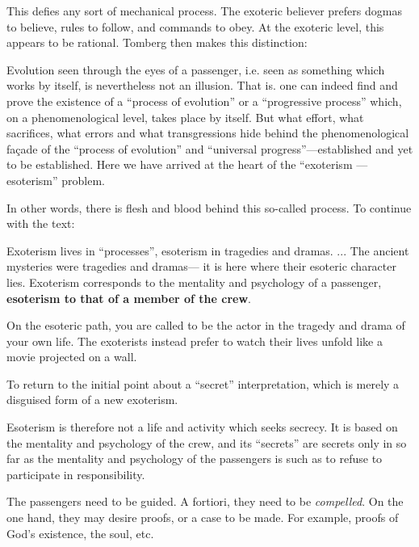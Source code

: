 This defies any sort of mechanical process. The exoteric believer prefers dogmas to believe, rules to follow, and commands to obey. At the exoteric level, this appears to be rational. Tomberg then makes this distinction:

\begin{quotex}
Evolution seen through the eyes of a passenger, i.e. seen as something which works by itself, is nevertheless not an illusion. That is. one can indeed find and prove the existence of a ``process of evolution'' or a ``progressive process'' which, on a phenomenological level, takes place by itself. But what effort, what sacrifices, what errors and what transgressions hide behind the phenomenological façade of the ``process of evolution'' and ``universal progress''---established and yet to be established. Here we have arrived at the heart of the ``exoterism --- esoterism'' problem.
\end{quotex}


In other words, there is flesh and blood behind this so-called process. To continue with the text:

\begin{quotex}
Exoterism lives in ``processes'', esoterism in tragedies and dramas. ... The ancient mysteries were tragedies and dramas--- it is here where their esoteric character lies. Exoterism corresponds to the mentality and psychology of a passenger, \textbf{esoterism to that of a member of the crew}.
\end{quotex}


On the esoteric path, you are called to be the actor in the tragedy and drama of your own life. The exoterists instead prefer to watch their lives unfold like a movie projected on a wall.

To return to the initial point about a ``secret'' interpretation, which is merely a disguised form of a new exoterism.

\begin{quotex}
Esoterism is therefore not a life and activity which seeks secrecy. It is based on the mentality and psychology of the crew, and its ``secrets'' are secrets only in so far as the mentality and psychology of the passengers is such as to refuse to participate in responsibility.
\end{quotex}


The passengers need to be guided. A fortiori, they need to be \emph{compelled}. On the one hand, they may desire proofs, or a case to be made. For example, proofs of God's existence, the soul, etc.


